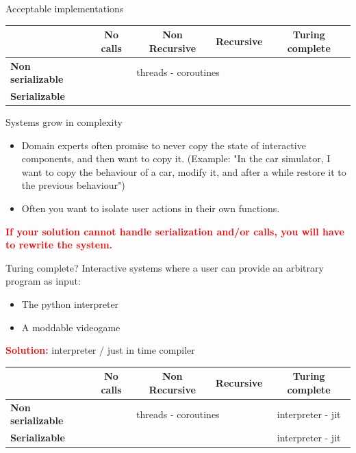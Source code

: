 \documentclass[aspectratio=169,11pt]{beamer}
\begin{document}
\begin{frame}{Acceptable implementations}
\renewcommand{\arraystretch}{1.3} %
\setlength{\tabcolsep}{3pt}       %


\begin{tabularx}{\textwidth}{l|c|c|c|c}
\hline
 & \textbf{No calls}
 & \textbf{Non Recursive}
 & \textbf{Recursive}
 & \textbf{Turing complete} \\
\hline
    \textbf{Non serializable}       &  \multicolumn{3}{|c|}{threads - coroutines }   \\
\hline
\textbf{Serializable}        &  &  &  &   \\
\hline
\end{tabularx}
\end{frame}

\begin{frame}{Systems grow in complexity}
    \begin{itemize}
        \item Domain experts often promise to never copy the state of interactive components, and then want to copy it. (Example: "In the car simulator, I want to copy the behaviour of a car, modify it, and after a while restore it to the previous behaviour")
        \item Often you want to isolate user actions in their own functions. 
    \end{itemize}

    \textbf{\textcolor{red}{If your solution cannot handle serialization and/or calls, you will have to rewrite the system.}}

\end{frame}

\begin{frame}{Turing complete?}
Interactive systems where a user can provide an arbitrary program as input:
\begin{itemize}
    \item The python interpreter
    \item A moddable videogame 
\end{itemize}

\textbf{\textcolor{red} {Solution:}} interpreter / just in time compiler
\renewcommand{\arraystretch}{1.3} %
\setlength{\tabcolsep}{3pt}       %


\begin{tabularx}{\textwidth}{l|c|c|c|c}
\hline
 & \textbf{No calls}
 & \textbf{Non Recursive}
 & \textbf{Recursive}
 & \textbf{Turing complete} \\
\hline
    \textbf{Non serializable}       &  \multicolumn{3}{|c|}{threads - coroutines } & interpreter  - jit \\
\hline
\textbf{Serializable}        &  &  &  &  interpreter - jit\\
\hline
\end{tabularx}
\end{frame}
\end{document}
